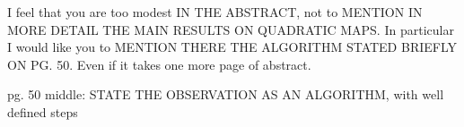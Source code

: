 I feel that you are too modest IN THE ABSTRACT, not to MENTION IN MORE DETAIL THE MAIN RESULTS ON QUADRATIC MAPS. In particular I would like you to MENTION THERE THE ALGORITHM STATED BRIEFLY ON PG. 50. Even if it takes one more page of abstract.


pg. 50  middle:  STATE THE OBSERVATION AS AN ALGORITHM, with well defined steps
